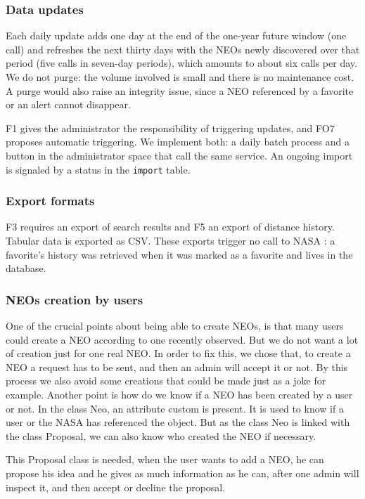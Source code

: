 \subsubsection{Data updates}

Each daily update adds one day at the end of the one-year future window
(one call) and refreshes the next thirty days with the NEOs newly discovered
over that period (five calls in seven-day periods), which amounts to about
six calls per day. We do not purge: the volume involved is small and there
is no maintenance cost. A purge would also raise an integrity issue, since a
NEO referenced by a favorite or an alert cannot disappear.

F1 gives the administrator the responsibility of triggering updates, and FO7
proposes automatic triggering. We implement both: a daily batch process and
a button in the administrator space that call the same service. An ongoing
import is signaled by a status in the \texttt{import} table.

\subsubsection{Export formats}

F3 requires an export of search results and F5 an export of distance
history. Tabular data is exported as CSV. These exports trigger no call to
NASA : a favorite's history was retrieved when it was marked as a favorite
and lives in the database.

\subsubsection{NEOs creation by users}

One of the crucial points about being able to create NEOs, is that many users could create a NEO according to one recently observed. But we do not want a lot of creation just for one real NEO. In order to fix this, we chose that, to create a NEO a request has to be sent, and then an admin will accept it or not. By this process we also avoid some creations that could be made just as a joke for example.
Another point is how do we know if a NEO has been created by a user or not. In the class Neo, an attribute custom is present. It is used to know if a user or the NASA has referenced the object. But as the class Neo is linked with the class Proposal, we can also know who created the NEO if necessary.

This Proposal class is needed, when the user wants to add a NEO, he can propose his idea and he gives as much information as he can, after one admin will inspect it, and then accept or decline the proposal.

